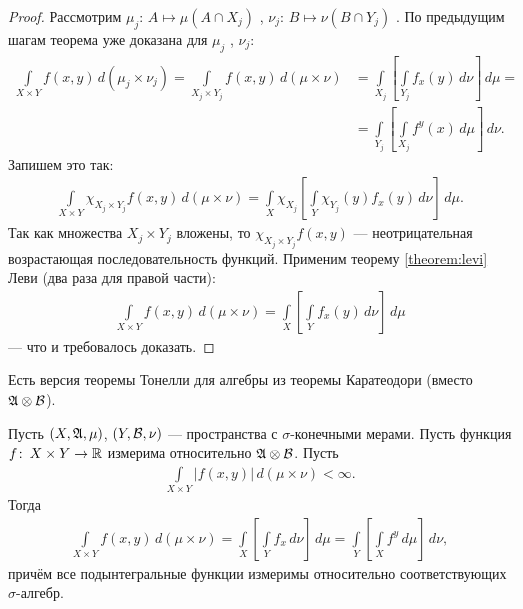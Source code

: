 \begin{proof}
 Рассмотрим $\mu_j \colon\, A \mapsto \mu(A \cap X_j)$ , $\nu_j \colon\, B \mapsto \nu(B \cap Y_j)$ . По предыдущим шагам теорема уже доказана для $\mu_j$ , $\nu_j$: \begin{align*}
  \int\limits_{X \times Y} f(x,y) \, d(\mu_j \times \nu_j) = \int\limits_{X_j \times Y_j} f(x,y) \, d(\mu \times \nu) &= \int\limits_{X_j} \left[ \int\limits_{Y_j} f_x(y) \, d\nu   \right] \, d\mu  = \\
  &= \int\limits_{Y_j} \left[ \int\limits_{X_j} f^{y}(x) \, d\mu   \right] \, d\nu
 .\end{align*} Запишем это так: \begin{align*}
 \int\limits_{X \times Y} \chi_{X_j \times Y_j} f(x, y) \, d(\mu \times \nu) = \int\limits_{X} \chi_{X_j} \left[ \int\limits_{Y} \chi_{Y_j}(y) f_x(y) \, d\nu   \right] \, d\mu  
.\end{align*} Так как множества $X_j \times Y_j$  вложены, то $\chi_{X_j \times Y_j} f(x,y)$  --- неотрицательная возрастающая последовательность функций. Применим теорему \ref{theorem:levi} Леви (два раза для правой части): \begin{align*}
 \int\limits_{X \times Y} f(x,y) \, d(\mu \times \nu)  = \int\limits_{X} \left[ \int\limits_{Y} f_x(y) \, d\nu   \right] \, d\mu  
\end{align*} --- что и требовалось доказать.
\end{proof}
\begin{remrk*}
 Есть версия теоремы Тонелли для алгебры из теоремы Каратеодори (вместо $\mathfrak{A} \otimes \mathcal{B}$).
\end{remrk*}
\begin{thm}[%
Фубини]
\label{theorem:fubini}

Пусть $(X, \mathfrak{A}, \mu)$, $(Y, \mathcal{B}, \nu)$  --- пространства с $\sigma$-конечными мерами. Пусть функция $f \colon\, X \times Y \to \mathbb{R}  $ измерима относительно $\mathfrak{A} \otimes \mathcal{B}$. Пусть \begin{align}
 \label{equation:theorem:fubini}
 \int\limits_{X \times Y} \left| f(x, y) \right| \, d(\mu \times \nu) < \infty
.\end{align} Тогда \begin{align*}
 \int\limits_{X \times Y} f(x,y) \, d(\mu \times \nu)  = \int\limits_{X} \left[ \int\limits_{Y} f_x \, d\nu   \right] \, d\mu    = \int\limits_{Y} \left[ \int\limits_{X} f^{y} \, d\mu   \right] \, d\nu  ,
\end{align*} причём все подынтегральные функции измеримы относительно соответствующих $\sigma$-алгебр.
\end{thm}
